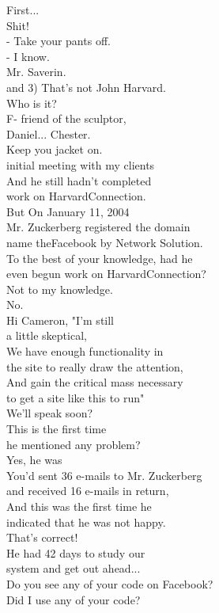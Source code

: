\documentclass{article}
\begin{document}
\begin{multicols}{3}
First...\\
Shit!\\
- Take your pants off.\\
- I know.\\
Mr. Saverin.\\
and 3) That's not John Harvard.\\
Who is it?\\
F- friend of the sculptor,\\
Daniel... Chester.\\
Keep you jacket on.\\
initial meeting with my clients\\
And he still hadn't completed\\
work on HarvardConnection.\\
But On January 11, 2004\\
Mr. Zuckerberg registered the domain\\
name theFacebook by Network Solution.\\
To the best of your knowledge, had he\\
even begun work on HarvardConnection?\\
Not to my knowledge.\\
No.\\
Hi Cameron, "I'm still\\
a little skeptical,\\
We have enough functionality in\\
the site to really draw the attention,\\
And gain the critical mass necessary\\
to get a site like this to run"\\
We'll speak soon?\\
This is the first time\\
he mentioned any problem?\\
Yes, he was\\
You'd sent 36 e-mails to Mr. Zuckerberg\\
and received 16 e-mails in return,\\
And this was the first time he\\
indicated that he was not happy.\\
That's correct!\\
He had 42 days to study our\\
system and get out ahead...\\
Do you see any of your code on Facebook?\\
Did I use any of your code?\\

\end{multicols}
\end{document}
